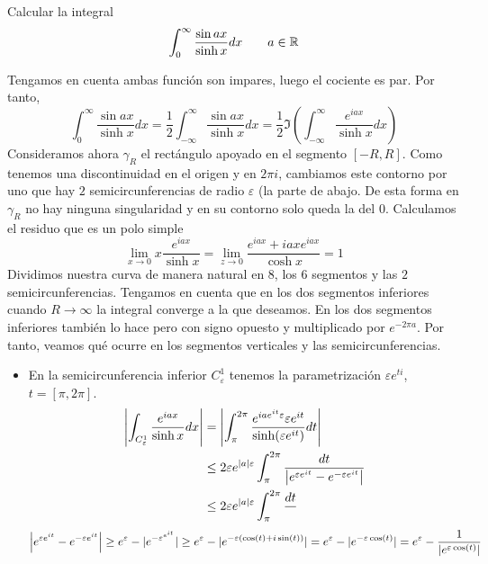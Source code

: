 \documentclass[twoside]{article}
\begin{document}
\begin{ejercicio}{4}
Calcular la integral
$$
\int_0^\infty \frac{\sin ax}{\sinh x}dx \qquad a \in \mathbb{R}
$$
\end{ejercicio}
\begin{solucion}
Tengamos en cuenta ambas función son impares, luego el cociente es par. Por tanto,
$$
\int_0^\infty \frac{\sin ax}{\sinh x}dx 
 = \frac{1}{2} \int_{-\infty}^\infty \frac{\sin ax}{\sinh x}dx = \frac{1}{2}\Im\left( \int_{-\infty}^\infty \frac{e^{iax}}{\sinh x}dx\right)
$$
Consideramos ahora $\gamma_R$ el rectángulo apoyado en el segmento $[-R,R]$. Como tenemos una discontinuidad en el origen y en $2\pi i$, cambiamos este contorno por uno que hay $2$ semicircunferencias de radio $\varepsilon$ (la parte de abajo. De esta forma en $\gamma_R$ no hay ninguna singularidad y en su contorno solo queda la del $0$. Calculamos el residuo que es un polo simple
$$
\lim_{x\to0}x\frac{e^{iax}}{\sinh x} = \lim_{z\to0}\frac{e^{iax}+iaxe^{iax}}{\cosh x} = 1
$$
Dividimos nuestra curva de manera natural en $8$, los $6$ segmentos y las $2$ semicircunferencias. Tengamos en cuenta que en los dos segmentos inferiores cuando $R\to \infty$ la integral converge a la que deseamos. En los dos segmentos inferiores también lo hace pero con signo opuesto y multiplicado por $e^{-2\pi a}$. Por tanto, veamos qué ocurre en los segmentos verticales y las semicircunferencias.
\begin{itemize}
\item En la semicircunferencia inferior $C^1_\varepsilon$ tenemos la parametrización $\varepsilon e^{ti}$, $t=[\pi,2\pi]$.
\begin{align*}
\left\lvert\int_{C^1_\varepsilon} \frac{e^{iax}}{\sinh x}dx\right\rvert &= \left\lvert\int_{\pi}^{2\pi} \frac{e^{iae^{it}\varepsilon}\varepsilon e^{it}}{\sinh(\varepsilon e^{it})}dt\right\rvert\\
& \leq 2 \varepsilon e^{|a|\varepsilon}\int_\pi^{2\pi}\frac{dt}{\left\lvert e^{\varepsilon e^{it}}-e^{-\varepsilon e^{it}}\right\rvert}\\
&\leq 2 \varepsilon e^{|a|\varepsilon}\int_\pi^{2\pi}\frac{dt}{}
\end{align*}
$$
\left\lvert e^{\varepsilon e^{it}}-e^{-\varepsilon e^{it}}\right\rvert \geq e^\varepsilon - |e^{-\varepsilon^{e^{it}}}| \geq e^\varepsilon - |e^{-\varepsilon(\cos(t)+i\sin(t))}| = e^\varepsilon - |e^{-\varepsilon\cos(t)}| = e^\varepsilon - \frac{1}{|e^{\varepsilon \cos(t)}|}
$$
\end{itemize}
\end{solucion}
\newpage
\end{document}
